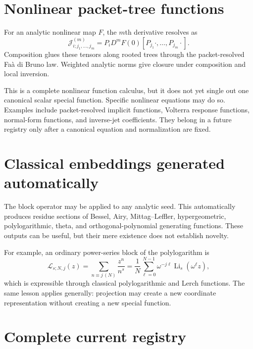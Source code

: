 \documentclass[11pt]{article}
\theoremstyle{definition}
\theoremstyle{remark}
\newcommand{\Li}{\operatorname{Li}}
\begin{document}
\section{Nonlinear packet-tree functions}

For an analytic nonlinear map $F$, the $m$th derivative resolves as
\[
\mathcal J^{(m)}_{i;j_1,\ldots,j_m}
=P_iD^mF(0)[P_{j_1}\cdot,\ldots,P_{j_m}\cdot].
\]
Composition glues these tensors along rooted trees through the packet-resolved Faà di Bruno law.  Weighted analytic norms give closure under composition and local inversion.

This is a complete nonlinear function calculus, but it does not yet single out one canonical scalar special function.  Specific nonlinear equations may do so.  Examples include packet-resolved implicit functions, Volterra response functions, normal-form functions, and inverse-jet coefficients.  They belong in a future registry only after a canonical equation and normalization are fixed.

\section{Classical embeddings generated automatically}

The block operator may be applied to any analytic seed.  This automatically produces residue sections of Bessel, Airy, Mittag--Leffler, hypergeometric, polylogarithmic, theta, and orthogonal-polynomial generating functions.  These outputs can be useful, but their mere existence does not establish novelty.

For example, an ordinary power-series block of the polylogarithm is
\[
\mathcal L_{s;N,j}(z)
=\sum_{n\equiv j\, (N)}\frac{z^n}{n^s}
=\frac1N\sum_{\ell=0}^{N-1}\omega^{-j\ell}\Li_s(\omega^\ell z),
\]
which is expressible through classical polylogarithmic and Lerch functions.  The same lesson applies generally: projection may create a new coordinate representation without creating a new special function.

\section{Complete current registry}
\end{document}
